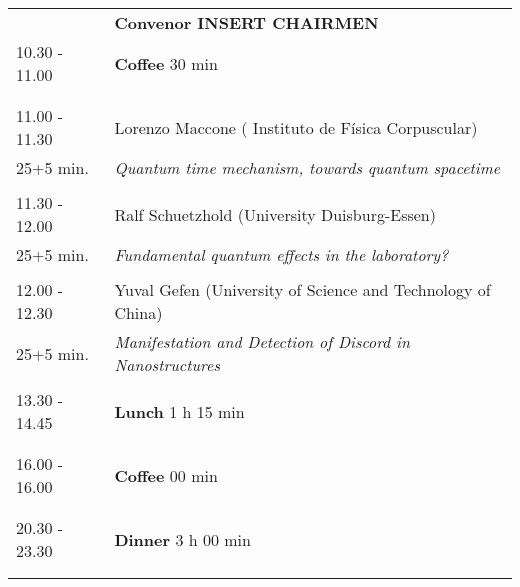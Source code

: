 \begin{longtable}{p{3cm}p{13cm}}
&\hfill {\bf Convenor INSERT CHAIRMEN }\\ 
10.30 - 11.00 & {\bf Coffee} \hfill 30 min \\ 
 & \\ 
 & \\ 
11.00 - 11.30 & Lorenzo Maccone ( Instituto de Física Corpuscular)\\ 
25+5 min. & {\it Quantum time mechanism, towards quantum spacetime}\\ 
 & \\ 
11.30 - 12.00 & Ralf Schuetzhold (University Duisburg-Essen)\\ 
25+5 min. & {\it Fundamental quantum effects in the laboratory?}\\ 
 & \\ 
12.00 - 12.30 & Yuval Gefen (University of Science and Technology of China)\\ 
25+5 min. & {\it Manifestation and Detection of Discord in Nanostructures}\\ 
 & \\ 
13.30 - 14.45 & {\bf Lunch} \hfill 1 h 15 min \\ 
 & \\ 
 & \\ 
16.00 - 16.00 & {\bf Coffee} \hfill 00 min \\ 
 & \\ 
 & \\ 
20.30 - 23.30 & {\bf Dinner} \hfill 3 h 00 min \\ 
 & \\ 
 & \\ 
\end{longtable}

